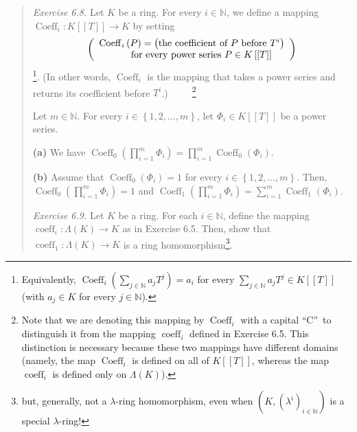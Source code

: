 \documentclass[numbers=enddot,12pt,final,onecolumn,notitlepage]{scrartcl}%
\begin{document}
\begin{quotation}
\textit{Exercise 6.8.} Let $K$ be a ring. For every $i\in\mathbb{N}$, we
define a mapping $\operatorname*{Coeff}\nolimits_{i}:K\left[  \left[
T\right]  \right]  \rightarrow K$ by setting%
\[
\left(
\begin{array}
[c]{l}%
\operatorname*{Coeff}\nolimits_{i}\left(  P\right)  =\left(  \text{the
coefficient of }P\text{ before }T^{i}\right) \\
\ \ \ \ \ \ \ \ \ \ \text{for every power series }P\in K\left[  \left[
T\right]  \right]
\end{array}
\right)
\]
\footnote{Equivalently, $\operatorname*{Coeff}\nolimits_{i}\left(
\sum\limits_{j\in\mathbb{N}}a_{j}T^{j}\right)  =a_{i}$ for every
$\sum\limits_{j\in\mathbb{N}}a_{j}T^{j}\in K\left[  \left[  T\right]  \right]
$ (with $a_{j}\in K$ for every $j\in\mathbb{N}$).}. (In other words,
$\operatorname*{Coeff}\nolimits_{i}$ is the mapping that takes a power series
and returns its coefficient before $T^{i}$.)\ \ \ \ \ \footnote{Note that we
are denoting this mapping by $\operatorname*{Coeff}\nolimits_{i}$ with a
capital \textquotedblleft C\textquotedblright\ to distinguish it from the
mapping $\operatorname*{coeff}\nolimits_{i}$ defined in Exercise 6.5. This
distinction is necessary because these two mappings have different domains
(namely, the map $\operatorname*{Coeff}\nolimits_{i}$ is defined on all of
$K\left[  \left[  T\right]  \right]  $, whereas the map $\operatorname*{coeff}%
\nolimits_{i}$ is defined only on $\Lambda\left(  K\right)  $).}

Let $m\in\mathbb{N}$. For every $i\in\left\{  1,2,...,m\right\}  $, let
$\Phi_{i}\in K\left[  \left[  T\right]  \right]  $ be a power series.

\textbf{(a)} We have $\operatorname*{Coeff}\nolimits_{0}\left(  \prod
\limits_{i=1}^{m}\Phi_{i}\right)  =\prod\limits_{i=1}^{m}\operatorname*{Coeff}%
\nolimits_{0}\left(  \Phi_{i}\right)  $.

\textbf{(b)} Assume that $\operatorname*{Coeff}\nolimits_{0}\left(  \Phi
_{i}\right)  =1$ for every $i\in\left\{  1,2,...,m\right\}  $. Then,
$\operatorname*{Coeff}\nolimits_{0}\left(  \prod\limits_{i=1}^{m}\Phi
_{i}\right)  =1$ and $\operatorname*{Coeff}\nolimits_{1}\left(  \prod
\limits_{i=1}^{m}\Phi_{i}\right)  =\sum\limits_{i=1}^{m}\operatorname*{Coeff}%
\nolimits_{1}\left(  \Phi_{i}\right)  $.

\textit{Exercise 6.9.} Let $K$ be a ring. For each $i\in\mathbb{N}$, define
the mapping $\operatorname*{coeff}\nolimits_{i}:\Lambda\left(  K\right)
\rightarrow K$ as in Exercise 6.5. Then, show that $\operatorname*{coeff}%
\nolimits_{1}:\Lambda\left(  K\right)  \rightarrow K$ is a ring
homomorphism\footnote{but, generally, not a $\lambda$-ring homomorphism, even
when $\left(  K,\left(  \lambda^{i}\right)  _{i\in\mathbb{N}}\right)  $ is a
special $\lambda$-ring!}.


\end{quotation}
\end{document}
